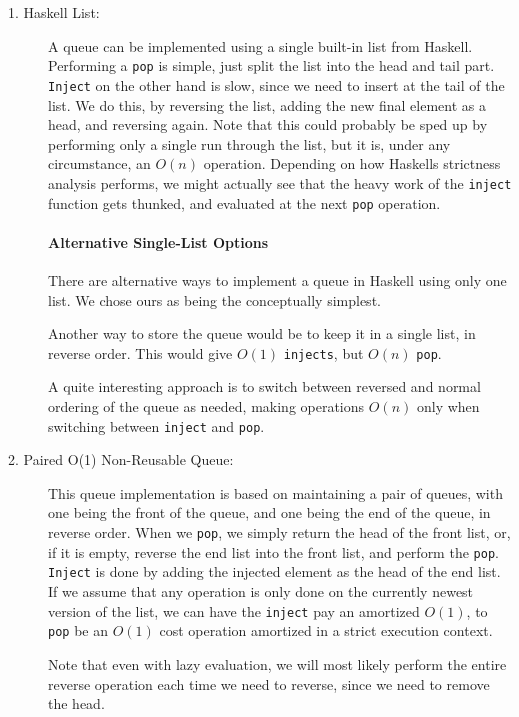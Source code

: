 \begin{description}
\item[1. Haskell List:] 
A queue can be implemented using a single built-in list from Haskell. 
Performing a \texttt{pop} is simple, just split the list into the head and tail part.
\texttt{Inject} on the other hand is slow, since we need to insert at the tail of the list. We do this, by reversing the list, adding the new final element as a head, and reversing again. Note that this could probably be sped up by performing only a single run through the list, but it is, under any circumstance, an $O(n)$ operation.
Depending on how Haskells strictness analysis performs, we might actually see that the heavy work of the \texttt{inject} function gets thunked, and evaluated at the next \texttt{pop} operation.

\paragraph{Alternative Single-List Options}

There are alternative ways to implement a queue in Haskell using only one list. We chose ours as being the conceptually simplest.

Another way to store the queue would be to keep it in a single list, in reverse order. This would give $O(1)$ \texttt{injects}, but $O(n)$ \texttt{pop}.

A quite interesting approach is to switch between reversed and normal ordering of the queue as needed, making operations $O(n)$ only when switching between \texttt{inject} and \texttt{pop}. 

\item[2. Paired O(1) Non-Reusable Queue:]
This queue implementation is based on maintaining a pair of queues, with one being the front of the queue, and one being the end of the queue, in reverse order. 
When we \texttt{pop}, we simply return the head of the front list, or, if it is empty, reverse the end list into the front list, and perform the \texttt{pop}.
\texttt{Inject} is done by adding the injected element as the head of the end list.
If we assume that any operation is only done on the currently newest version of the list, we can have the \texttt{inject} pay an amortized $O(1)$, to \texttt{pop} be an $O(1)$ cost operation amortized in a strict execution context.

Note that even with lazy evaluation, we will most likely perform the entire reverse operation each time we need to reverse, since we need to remove the head.


\end{description}
